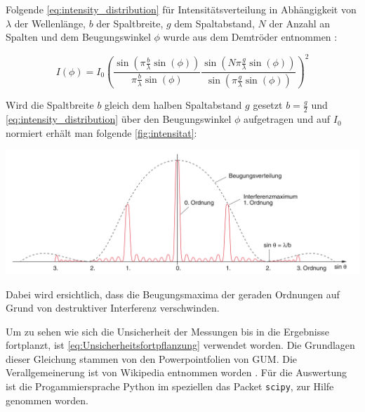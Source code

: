 \documentclass[11pt,ngerman]{scrartcl}
\begin{document}
\noindent Folgende \autoref{eq:intensity_distribution} für Intensitätsverteilung in Abhängigkeit von
$\lambda$ der Wellenlänge, $b$ der Spaltbreite, $g$ dem Spaltabstand, $N$ der Anzahl an Spalten und
dem Beugungswinkel $\phi$ wurde aus dem Demtröder entnommen \cite{demtroder2018ex2}:

\begin{equation}
	I(\phi) = I_0 \left(\frac{\sin(\pi \frac{b}{\lambda} \sin(\phi))}{\pi \frac{b}{\lambda}\sin(\phi)} \frac{\sin(N \pi \frac{g}{\lambda} \sin(\phi))}{\sin(\pi \frac{g}{\lambda} \sin(\phi))}\right)^2
	\label{eq:intensity_distribution}
\end{equation}

\noindent Wird die Spaltbreite $b$ gleich dem halben Spaltabstand $g$ gesetzt $b = \frac{g}{2}$ und \autoref{eq:intensity_distribution} über
den Beugungswinkel $\phi$ aufgetragen und auf $I_0$ normiert erhält man folgende \autoref{fig:intensitat}:

\begin{center}
	\begin{minipage}[t]{\textwidth}
		\includegraphics[width=\textwidth]{interferenz}
		\label{fig:intensitat}
	\end{minipage}
\end{center}

\noindent Dabei wird ersichtlich, dass die Beugungsmaxima der geraden Ordnungen auf Grund von destruktiver Interferenz verschwinden.

\vspace{2mm}

\noindent Um zu sehen wie sich die Unsicherheit der Messungen bis in die Ergebnisse
fortplanzt, ist \autoref{eq:Unsicherheitsfortpflanzung} verwendet worden.
Die Grundlagen dieser Gleichung stammen von den Powerpointfolien von
GUM.\cite{WolfgangKessel2004} Die Verallgemeinerung ist von Wikipedia entnommen
worden \cite{2020Fehler}.
Für die Auswertung ist die Progammiersprache Python im speziellen das
Packet \verb#scipy#, zur Hilfe genommen worden.
\end{document}
